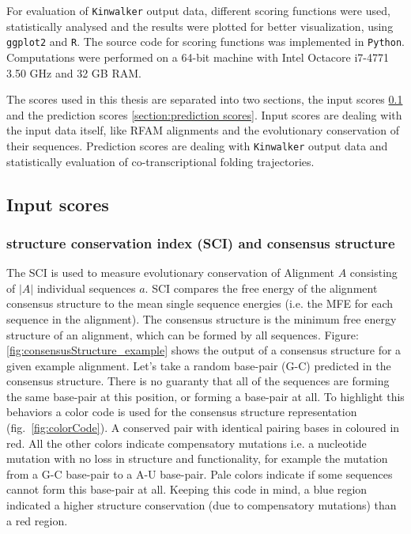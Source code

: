 \documentclass[ twoside,openright,titlepage,numbers=noenddot,headinclude,%
                footinclude=false, cleardoublepage=empty,abstractoff, %
                BCOR=5mm,paper=a4,fontsize=11pt,%
                ngerman,american,%
                ]{scrreprt}
\begin{document}
For evaluation of \texttt{Kinwalker} output data, different scoring functions were used, statistically analysed and the results were plotted for better visualization, using  \texttt{ggplot2}\citep{ggplot2} and  \texttt{R}\citep{R}. The source code for scoring functions was implemented in  \texttt{Python}\cite{python}. 
Computations were performed on a 64-bit machine with Intel Octacore i7-4771 3.50 GHz and 32 GB RAM.

The scores used in this thesis are separated into two sections, the input scores \ref{section:input scores} and the prediction scores \ref{section:prediction scores}.
Input scores are dealing with the input data itself, like RFAM alignments and the evolutionary conservation of their sequences. Prediction scores are dealing with \texttt{Kinwalker} output data and statistically evaluation of co-transcriptional folding trajectories.  

\subsection{Input scores} \label{section:input scores}

\subsubsection{structure conservation index (SCI)\cite{Washietl:2005} and consensus structure}
			
The SCI is used to measure evolutionary conservation of Alignment $A$
consisting of ${|A|}$ individual sequences $a$.
SCI compares the free energy of the alignment consensus structure to the
mean single sequence energies (i.e. the MFE for each sequence in the
alignment). The consensus structure is the minimum free energy structure of
an alignment, which can be formed by all sequences. Figure:
\ref{fig:consensusStructure_example} shows the output of a consensus
structure for a given example alignment. Let's take a random base-pair
(G-C) predicted in the consensus structure. There is no guaranty that all
of the sequences are forming the same base-pair at this position, or
forming a base-pair at all. To highlight this behaviors a color code is
used for the consensus structure representation (fig.~\ref{fig:colorCode}). A
conserved pair with identical pairing bases in coloured in red. All the other colors indicate compensatory mutations i.e. a nucleotide mutation with no loss in structure and functionality, for example the mutation from a G-C base-pair to a A-U base-pair. Pale colors indicate if some sequences cannot form this base-pair at all. Keeping this code in mind, a blue region indicated a higher structure conservation (due to compensatory mutations) than a red region.
\end{document}
